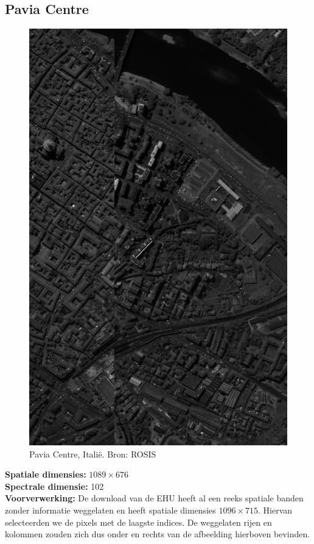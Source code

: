 \newpage
\subsection{Pavia Centre}

\begin{figure}[H]
  \centering
  \includegraphics[scale=0.4]{images/pavia_sum.png}
  \caption{Pavia Centre, Itali\"e. Bron: ROSIS \cite{ref:ehu_rosis}}
  \label{fig:pavia_sum}
\end{figure}

\textbf{Spatiale dimensies:} $1089 \times 676$\\
\textbf{Spectrale dimensie:} 102\\
\textbf{Voorverwerking:} De download van de EHU \cite{ref:ehu_rosis} heeft al een reeks spatiale banden zonder informatie weggelaten en heeft spatiale dimensies $1096 \times 715$. Hiervan selecteerden we de pixels met de laagste indices. De weggelaten rijen en kolommen zouden zich dus onder en rechts van de afbeelding hierboven bevinden.

